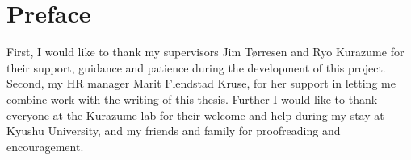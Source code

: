 \chapter*{Preface}
First, I would like to thank my supervisors Jim Tørresen and Ryo Kurazume for their support, guidance and patience during the development of this project. Second, my HR manager Marit Flendstad Kruse, for her support in letting me combine work with the writing of this thesis. Further I would like to thank everyone at the Kurazume-lab for their welcome and help during my stay at Kyushu University, and my friends and family for proofreading and encouragement.


